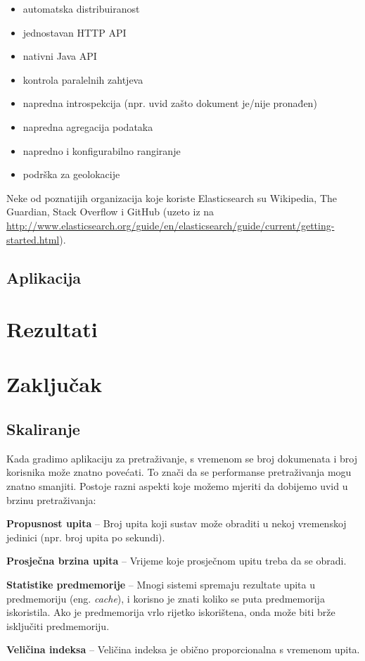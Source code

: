 \documentclass[a4paper,twoside,12pt]{scrreprt}
\begin{document}
\begin{itemize}
  \item automatska distribuiranost
  \item jednostavan HTTP API
  \item nativni Java API
  \item kontrola paralelnih zahtjeva
  \item napredna introspekcija (npr. uvid zašto dokument je/nije pronađen)
  \item napredna agregacija podataka
  \item napredno i konfigurabilno rangiranje
  \item podrška za geolokacije
\end{itemize}

Neke od poznatijih organizacija koje koriste Elasticsearch su Wikipedia, The Guardian, Stack Overflow i GitHub (uzeto iz \cite{elastic} na \url{http://www.elasticsearch.org/guide/en/elasticsearch/guide/current/getting-started.html}).

\section{Aplikacija}

\chapter{Rezultati}

\chapter{Zaključak}

\section{Skaliranje}

Kada gradimo aplikaciju za pretraživanje, s vremenom se broj dokumenata i broj korisnika može znatno povećati. To znači da se performanse pretraživanja mogu znatno smanjiti. Postoje razni aspekti koje možemo mjeriti da dobijemo uvid u brzinu pretraživanja:

\begin{compactitem}
  \item \textbf{Propusnost upita} – Broj upita koji sustav može obraditi u nekoj vremenskoj jedinici (npr. broj upita po sekundi).
  \item \textbf{Prosječna brzina upita} – Vrijeme koje prosječnom upitu treba da se obradi.
  \item \textbf{Statistike predmemorije} – Mnogi sistemi spremaju rezultate upita u predmemoriju (eng. \textit{cache}), i korisno je znati koliko se puta predmemorija iskoristila. Ako je predmemorija vrlo rijetko iskorištena, onda može biti brže isključiti predmemoriju.
  \item \textbf{Veličina indeksa} – Veličina indeksa je obično proporcionalna s vremenom upita.
\end{compactitem}
\end{document}
